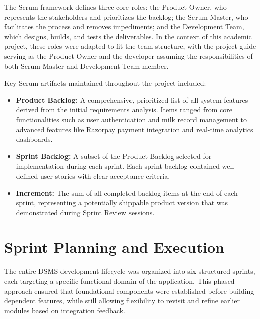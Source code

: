 \documentclass[12pt,a4paper]{report}
\begin{document}
The Scrum framework defines three core roles: the Product Owner, who represents the stakeholders and prioritizes the backlog; the Scrum Master, who facilitates the process and removes impediments; and the Development Team, which designs, builds, and tests the deliverables. In the context of this academic project, these roles were adapted to fit the team structure, with the project guide serving as the Product Owner and the developer assuming the responsibilities of both Scrum Master and Development Team member.

Key Scrum artifacts maintained throughout the project included:
\begin{itemize}
    \item \textbf{Product Backlog:} A comprehensive, prioritized list of all system features derived from the initial requirements analysis. Items ranged from core functionalities such as user authentication and milk record management to advanced features like Razorpay payment integration and real-time analytics dashboards.
    \item \textbf{Sprint Backlog:} A subset of the Product Backlog selected for implementation during each sprint. Each sprint backlog contained well-defined user stories with clear acceptance criteria.
    \item \textbf{Increment:} The sum of all completed backlog items at the end of each sprint, representing a potentially shippable product version that was demonstrated during Sprint Review sessions.
\end{itemize}

\section{Sprint Planning and Execution}
\vspace{0.5cm}
The entire DSMS development lifecycle was organized into six structured sprints, each targeting a specific functional domain of the application. This phased approach ensured that foundational components were established before building dependent features, while still allowing flexibility to revisit and refine earlier modules based on integration feedback.
\end{document}
